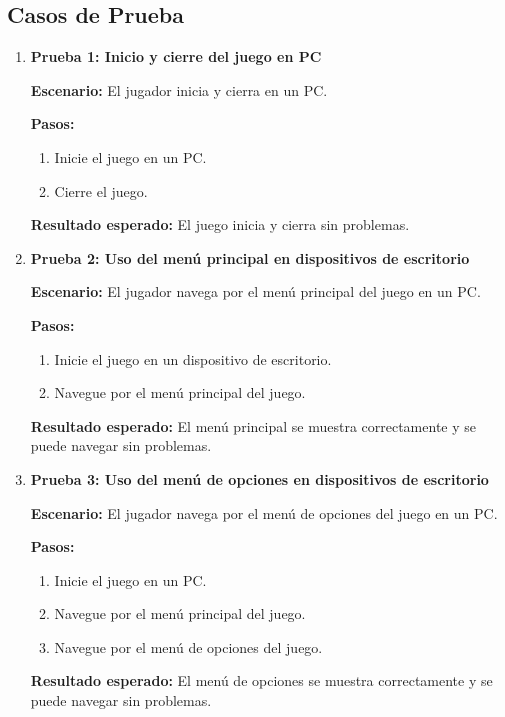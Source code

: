 \subsection{Casos de Prueba}
\begin{enumerate}
	\item \textbf{Prueba 1: Inicio y cierre del juego en PC}

	      \textbf{Escenario:} El jugador inicia y cierra en un PC.

	      \textbf{Pasos:}
	      \begin{enumerate}
		      \item Inicie el juego en un PC.
		      \item Cierre el juego.
	      \end{enumerate}

	      \textbf{Resultado esperado:} El juego inicia y cierra sin problemas.

	\item \textbf{Prueba 2: Uso del menú principal en dispositivos de escritorio}

	      \textbf{Escenario:} El jugador navega por el menú principal del juego en un PC.

	      \textbf{Pasos:}
	      \begin{enumerate}
		      \item Inicie el juego en un dispositivo de escritorio.
		      \item Navegue por el menú principal del juego.
	      \end{enumerate}

	      \textbf{Resultado esperado:} El menú principal se muestra correctamente y se puede navegar sin problemas.

	\item \textbf{Prueba 3: Uso del menú de opciones en dispositivos de escritorio}

	      \textbf{Escenario:} El jugador navega por el menú de opciones del juego en un PC.

	      \textbf{Pasos:}
	      \begin{enumerate}
		      \item Inicie el juego en un PC.
		      \item Navegue por el menú principal del juego.
		      \item Navegue por el menú de opciones del juego.
	      \end{enumerate}

	      \textbf{Resultado esperado:} El menú de opciones se muestra correctamente y se puede navegar sin problemas.


\end{enumerate}

